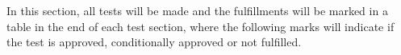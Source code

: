 In this section, all tests will be made and the fulfillments will be marked in a table in the end of each test section, where the following marks will indicate if the test is approved, conditionally approved or not fulfilled.
 \vspace{1cm}
    \startexplain
    \stopexplain